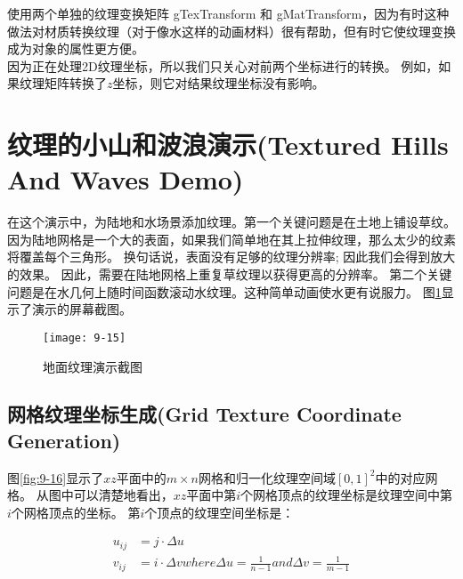 \begin{flushleft}
使用两个单独的纹理变换矩阵 gTexTransform 和 gMatTransform，因为有时这种做法对材质转换纹理（对于像水这样的动画材料）很有帮助，但有时它使纹理变换成为对象的属性更方便。\\

因为正在处理2D纹理坐标，所以我们只关心对前两个坐标进行的转换。 例如，如果纹理矩阵转换了$z$坐标，则它对结果纹理坐标没有影响。\\
\end{flushleft}

\section{纹理的小山和波浪演示(Textured Hills And Waves Demo)}
\begin{flushleft}
在这个演示中，为陆地和水场景添加纹理。第一个关键问题是在土地上铺设草纹。 因为陆地网格是一个大的表面，如果我们简单地在其上拉伸纹理，那么太少的纹素将覆盖每个三角形。 换句话说，表面没有足够的纹理分辨率; 因此我们会得到放大的效果。 因此，需要在陆地网格上重复草纹理以获得更高的分辨率。 第二个关键问题是在水几何上随时间函数滚动水纹理。这种简单动画使水更有说服力。 图\ref{fig:9-15}显示了演示的屏幕截图。\\
\end{flushleft}

\begin{figure}[h]
    \texttt{[image: 9-15]}
    \centering
    \caption{地面纹理演示截图}
    \label{fig:9-15}
\end{figure}

\subsection{网格纹理坐标生成(Grid Texture Coordinate Generation)}
\begin{flushleft}
图\ref{fig:9-16}显示了$xz$平面中的$m\times n$网格和归一化纹理空间域$[0,1]^{2}$中的对应网格。 从图中可以清楚地看出，$xz$平面中第$i$个网格顶点的纹理坐标是纹理空间中第$i$个网格顶点的坐标。 第$i$个顶点的纹理空间坐标是：\\
\end{flushleft}

\begin{align*}
u_{ij}&=j\cdot \Delta u\\
v_{ij}&=i\cdot \Delta v
where \Delta u=\frac{1}{n-1} and \Delta v=\frac{1}{m-1}
\end{align*}

